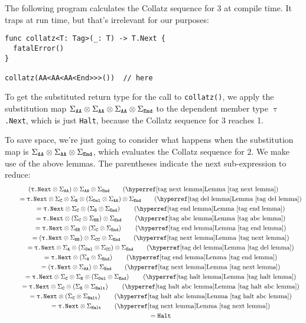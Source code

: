 \documentclass[../generics]{subfiles}
\begin{document}
\begin{example}
The following program calculates the Collatz sequence for $3$ at compile time. It traps at run time, but that's irrelevant for our purposes:
\begin{Verbatim}
func collatz<T: Tag>(_: T) -> T.Next {
  fatalError()
}

collatz(AA<AA<AA<End>>>())  // here
\end{Verbatim}
To get the substituted return type for the call to \texttt{collatz()}, we apply the substitution map $\Sigma_{\texttt{AA}}\otimes\Sigma_{\texttt{AA}}\otimes\Sigma_{\texttt{AA}}\otimes\Sigma_{\texttt{End}}$ to the dependent member type \texttt{$\uptau$.Next}, which is just \texttt{Halt}, because the Collatz sequence for 3 reaches 1.

To save space, we're just going to consider what happens when the substitution map is $\Sigma_{\texttt{AA}} \otimes \Sigma_{\texttt{AA}} \otimes \Sigma_{\texttt{End}}$, which evaluates the Collatz sequence for $2$. We make use of the above lemmas. The parentheses indicate the next sub-expression to reduce:
\begin{gather*}
\left(\TNext\otimes\SigmaAA\right)\otimes\SigmaAA\otimes\SigmaEnd \tag{\LemmaRef{tag next lemma}}\\
\qquad {} = \TNext \otimes \SigmaC \otimes \SigmaB \otimes \left(\SigmaDel \otimes \SigmaAA\right)\otimes\SigmaEnd \tag{\LemmaRef{tag del lemma}}\\
\qquad {} = \TNext \otimes \SigmaC \otimes \left(\SigmaB \otimes\SigmaEnd\right) \tag{\LemmaRef{tag end lemma}}\\
\qquad {} = \TNext \otimes \left(\SigmaC \otimes \SigmaBB\right) \otimes\SigmaEnd \tag{\LemmaRef{tag abc lemma}}\\
\qquad {} = \TNext \otimes \SigmaBB \otimes \left(\SigmaC \otimes\SigmaEnd\right) \tag{\LemmaRef{tag end lemma}}\\
\qquad {} = \left(\TNext\otimes\SigmaBB\right)\otimes\SigmaCC\otimes\SigmaEnd \tag{\LemmaRef{tag next lemma}}\\
\qquad {} = \TNext\otimes\SigmaA \otimes \left(\SigmaDel \otimes \SigmaCC\right)\otimes\SigmaEnd  \tag{\LemmaRef{tag del lemma}}\\
\qquad {} = \TNext\otimes\left(\SigmaA \otimes \SigmaEnd\right) \tag{\LemmaRef{tag end lemma}}\\
\qquad {} = \left(\TNext\otimes\SigmaAA\right) \otimes \SigmaEnd \tag{\LemmaRef{tag next lemma}}\\
\qquad {} = \TNext \otimes \SigmaC \otimes \SigmaB \otimes \left( \SigmaDel \otimes \SigmaEnd\right) \tag{\LemmaRef{tag halt lemma}}\\
\qquad {} = \TNext \otimes \SigmaC \otimes \left(\SigmaB \otimes \SigmaHalt\right) \tag{\LemmaRef{tag halt abc lemma}}\\
\qquad {} = \TNext \otimes \left(\SigmaC \otimes \SigmaHalt\right) \tag{\LemmaRef{tag halt abc lemma}}\\
\qquad {} = \TNext \otimes \SigmaHalt \tag{\LemmaRef{tag next lemma}}\\
\qquad {} = \Halt
\end{gather*}
\end{example}
\end{document}
